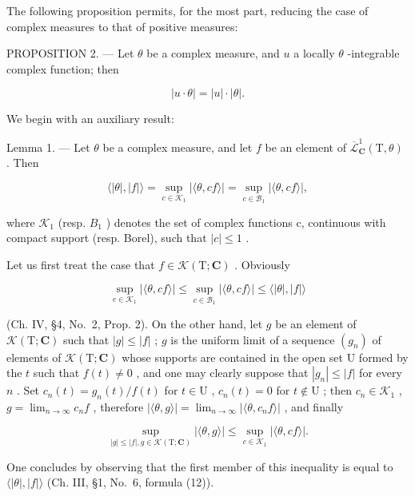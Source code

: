 The following proposition permits, for the most part, reducing the case of complex measures to that of positive measures:

PROPOSITION 2. --- Let \(\theta\) be a complex measure, and \(u\) a locally \(\theta\) -integrable complex function; then

\[
\left| u \cdot \theta \right| = \left| u \right| \cdot \left| \theta \right|.\tag{3}
\]

We begin with an auxiliary result:

Lemma 1. --- Let \(\theta\) be a complex measure, and let \(f\) be an element of \(\overline{\mathcal{L}}_{\mathbf{C}}^{1}(\mathrm{T},\theta)\) . Then

\[
\langle | \theta |, | f | \rangle = \sup _ {c \in \mathcal {K} _ {1}} | \langle \theta , c f \rangle | = \sup _ {c \in \mathcal {B} _ {1}} | \langle \theta , c f \rangle |,\tag{4}
\]

where \(\mathcal{K}_{1}\) (resp. \(B_{1}\) ) denotes the set of complex functions c, continuous with compact support (resp. Borel), such that \(|c| \leqslant 1\) .

Let us first treat the case that \(f \in \mathcal{K}(\mathrm{T};\mathbf{C})\) . Obviously

\[
\sup _ {c \in \mathcal {K} _ {1}} | \langle \theta , c f \rangle | \leqslant \sup _ {c \in \mathcal {B} _ {1}} | \langle \theta , c f \rangle | \leqslant \langle | \theta |, | f | \rangle
\]

(Ch. IV, §4, No.~2, Prop. 2). On the other hand, let \(g\) be an element of \(\mathcal{K}(\mathrm{T};\mathbf{C})\) such that \(|g| \leqslant |f|\) ; \(g\) is the uniform limit of a sequence \((g_n)\) of elements of \(\mathcal{K}(\mathrm{T};\mathbf{C})\) whose supports are contained in the open set \(\mathrm{U}\) formed by the \(t\) such that \(f(t) \neq 0\) , and one may clearly suppose that \(|g_n| \leqslant |f|\) for every \(n\) . Set \(c_n(t) = g_n(t)/f(t)\) for \(t \in \mathrm{U}\) , \(c_n(t) = 0\) for \(t \notin \mathrm{U}\) ; then \(c_n \in \mathcal{K}_1\) , \(g = \lim_{n \to \infty} c_n f\) , therefore \(|\langle \theta, g \rangle| = \lim_{n \to \infty} |\langle \theta, c_n f \rangle|\) , and finally

\[
\sup _ {| g | \leqslant | f |, g \in \mathscr {K} (\mathrm{T}; \mathbf {C})} | \langle \theta , g \rangle | \leqslant \sup _ {c \in \mathscr {K} _ {1}} | \langle \theta , c f \rangle |.
\]

One concludes by observing that the first member of this inequality is equal to \(\langle|\theta|,|f|\rangle\) (Ch. III, §1, No.~6, formula (12)).

